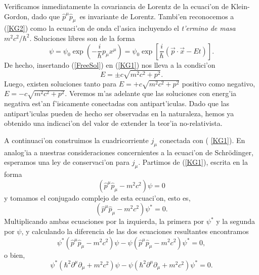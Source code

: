 Verificamos inmediatamente la covariancia de Lorentz de la ecuaci'on de
Klein-Gordon, dado que $\hat{p}^{\mu }\hat{p}_{\mu }$\ es invariante de
Lorentz. Tambi'en reconocemos a (\ref{KG2}) como la ecuaci'on de onda
cl'asica incluyendo el \emph{t'ermino de masa} $m^{2}c^{2}/\hbar
^{2} $. Soluciones libres son de la forma 
\begin{equation}
\psi =\psi _{0}\exp \left( -\frac{i}{\hbar }p_{\mu }x^{\mu }\right) =\psi
_{0}\exp \left[ \frac{i}{\hbar }\left( \vec{p}\cdot \vec{x}%
-Et\right) \right] . \label{FreeSol}
\end{equation}
De hecho, insertando (\ref{FreeSol}) en (\ref{KG1}) nos lleva a la
condici'on 
\begin{equation}
E=\pm c\sqrt{m^{2}c^{2}+p^{2}}.
\end{equation}
Luego, existen soluciones tanto para $E=+c\sqrt{m^{2}c^{2}+p^{2}}$ positivo
como negativo, $E=-c\sqrt{m^{2}c^{2}+p^{2}}$. Veremos m'as adelante que
las soluciones con energ'ia negativa est'an f'isicamente conectadas
con antipart'iculas. Dado que las antipart'iculas pueden de hecho ser
observadas en la naturaleza, hemos ya obtenido una indicaci'on del valor
de extender la teor'ia no-relativista.

A continuaci'on construimos la cuadricorriente $j_{\mu }$ conectada con (%
\ref{KG1}). En analog'ia a nuestras consideraciones concernientes a la
ecuaci'on de Schr\"{o}dinger, esperamos una ley de conservaci'on para $%
j_{\mu }$. Partimos de (\ref{KG1}), escrita en la forma 
\begin{equation}
\left( \hat{p}^{\mu }\hat{p}_{\mu }-m^{2}c^{2}\right) \psi =0
\end{equation}
y tomamos el conjugado complejo de esta ecuaci'on, esto es, 
\begin{equation}
\left( \hat{p}^{\mu }\hat{p}_{\mu }-m^{2}c^{2}\right) \psi ^{\ast }=0.
\end{equation}
Multiplicando ambas ecuaciones por la izquierda, la primera por $\psi ^{\ast
}$ y la segunda por $\psi $, y calculando la diferencia de las dos
ecuaciones resultantes encontramos 
\begin{equation}
\psi ^{\ast }\left( \hat{p}^{\mu }\hat{p}_{\mu }-m^{2}c^{2}\right) \psi
-\psi \left( \hat{p}^{\mu }\hat{p}_{\mu }-m^{2}c^{2}\right) \psi ^{\ast }=0,
\end{equation}
o bien, 
\begin{equation}
\psi ^{\ast }\left( \hbar ^{2}\partial ^{\mu }\partial _{\mu
}+m^{2}c^{2}\right) \psi -\psi \left( \hbar ^{2}\partial ^{\mu }\partial
_{\mu }+m^{2}c^{2}\right) \psi ^{\ast }=0.
\end{equation}



